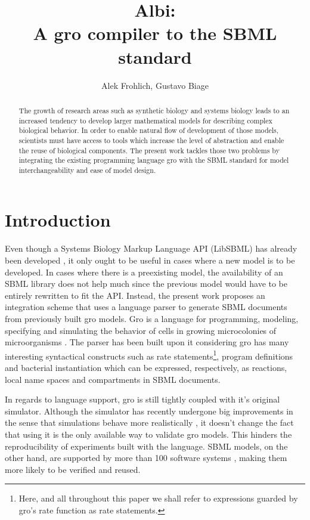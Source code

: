 \documentclass[12pt]{article}
\title{Albi:\\ A gro compiler to the SBML standard}
\author{Alek Frohlich\inst{1}, Gustavo Biage\inst{1}}
\begin{document}
\maketitle
\begin{abstract}


    The growth of research areas such as synthetic biology and systems biology leads to an increased tendency to develop larger mathematical models for describing complex biological behavior. In order to enable natural flow of development of those models, scientists must have access to tools which increase the level of abstraction and enable the reuse of biological components. The present work tackles those two problems by integrating the existing programming language gro with the SBML standard for model interchangeability and ease of model design.


\end{abstract}
\section{Introduction}


    Even though a Systems Biology Markup Language API (LibSBML) has already been developed \cite{Bornstein2008}, it only ought to be useful in cases where a new model is to be developed. In cases where there is a preexisting model, the availability of an SBML library does not help much since the previous model would have to be entirely rewritten to fit the API. Instead, the present work proposes an integration scheme that uses a language parser to generate SBML documents from previously built gro models. Gro is a language for programming, modeling, specifying and simulating the behavior of cells in growing microcolonies of microorganisms \cite{Jang2012}. The parser has been built upon it considering gro has many interesting syntactical constructs such as rate statements\footnote{Here, and all throughout this paper we shall refer to expressions guarded by gro's rate function as rate statements.}, program definitions and bacterial instantiation which can be expressed, respectively, as reactions, local name spaces and compartments in SBML documents.
    
    In regards to language support, gro is still tightly coupled with it's original simulator. Although the simulator has recently undergone big improvements in the sense that simulations behave more realistically \cite{Gutirrez2017}, it doesn't change the fact that using it is the only available way to validate gro models. This hinders the reproducibility of experiments built with the language. SBML models, on the other hand, are supported by more than 100 software systems \cite{Hucka2007}, making them more likely to be verified and reused.
    
\end{document}
